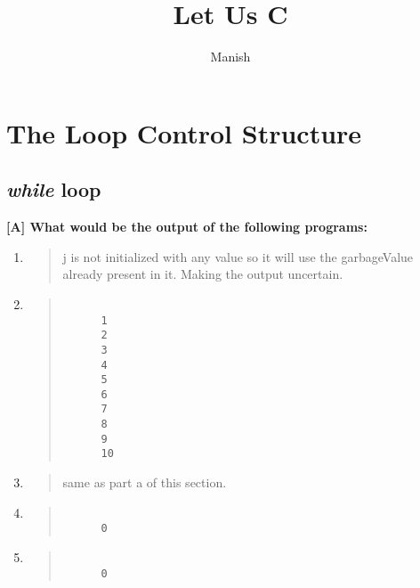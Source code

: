 \documentclass{report}
\title{Let Us C}
\author{Manish}
\begin{document}
\setcounter{chapter}{2}

\maketitle

\chapter{The Loop Control Structure}
\section*{\textit{while} loop}

\textbf{[A] What would be the output of the following programs:}
\begin{enumerate}
    \renewcommand{\labelenumi}{\alph{enumi}}
  \item \begin{quote}
      j is not initialized with any value so it will use the garbageValue \\
      already present in it. Making the output uncertain.\\
  \end{quote}

  \item \begin{quote}
  \begin{verbatim}
      
      1
      2
      3
      4
      5
      6
      7
      8
      9
      10
  \end{verbatim}
  \end{quote}

  \item \begin{quote}
      same as part a of this section.\\
  \end{quote}

  \item \begin{quote}
  \begin{verbatim}
      
      0
  \end{verbatim}
  \end{quote}

  \item \begin{quote}
  \begin{verbatim}
      
      0
  \end{verbatim}
  \end{quote}


\end{enumerate}
\end{document}
